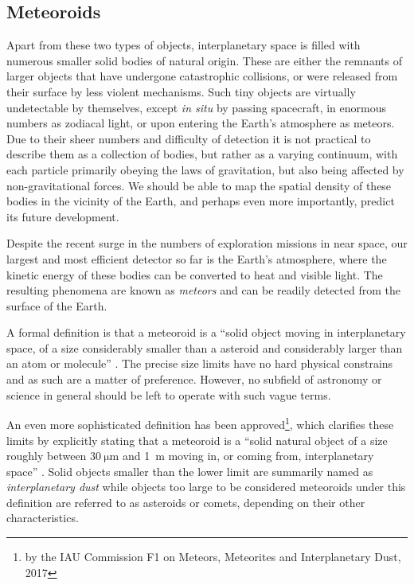     \subsection{Meteoroids} \label{iam}
        Apart from these two types of objects, interplanetary space is filled with numerous
        smaller solid bodies of natural origin. These are either the remnants of larger objects
        that have undergone catastrophic collisions, or were released from their surface by less violent mechanisms.
        Such tiny objects are virtually undetectable by themselves, except \textit{in situ} by passing spacecraft,
        in enormous numbers as zodiacal light, or upon entering the Earth's atmosphere as meteors.
        Due to their sheer numbers and difficulty of detection it is not practical to describe them as a collection of bodies,
        but rather as a varying continuum, with each particle primarily obeying the laws of gravitation,
        but also being affected by non-gravitational forces.
        We should be able to map the spatial density of these bodies in the vicinity of the Earth,
        and perhaps even more importantly, predict its future development.

        Despite the recent surge in the numbers of exploration missions in near space,
        our largest and most efficient detector so far is the Earth's atmosphere,
        where the kinetic energy of these bodies can be converted to heat and visible light.
        The resulting phenomena are known as \emph{meteors} and can be readily detected from the surface of the Earth.

        A formal definition is that a meteoroid is a ``solid object moving in interplanetary space,
        of a size considerably smaller than a asteroid and considerably larger than an atom or molecule'' \citep{millman1961}.
        The precise size limits have no hard physical constrains and as such are a matter of preference.
        However, no subfield of astronomy or science in general should be left to operate with such vague terms.

        An even more sophisticated definition has been approved\footnote{by the IAU Commission
        F1 on Meteors, Meteorites and Interplanetary Dust, 2017},
        which clarifies these limits by explicitly stating that a meteoroid is a ``solid natural object
        of a size roughly between $\SI{30}{\micro\metre}$ and \SI{1}{\metre} moving in, or coming from, interplanetary space'' \citep{imo-definitions}.
        Solid objects smaller than the lower limit are summarily named as \emph{interplanetary dust} while objects
        too large to be considered meteoroids under this definition are referred to as
        asteroids or comets, depending on their other characteristics.

